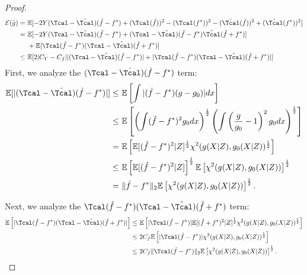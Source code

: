 \documentclass[12pt]{extarticle} %
\newcommand{\E}{\mathbb{E}}
\begin{document}
\begin{proof}
    \begin{align*}
    {\cal E}(\hat{g})
    =~& \E [-2Y (\Tcal-\hat{\Tcal})(\hat{f}-f^*) + (\Tcal(\hat{f}))^2-(\Tcal(f^*))^2 -(\hat{\Tcal}(\hat{f}))^2+(\hat{\Tcal}(f^*))^2]\\
    =~&\E[ -2Y (\Tcal-\hat{\Tcal})(\hat{f}-f^*) + (\Tcal-\hat{\Tcal})(\hat{f}-f^*)\hat{\Tcal}(\hat{f}+f^*)]\\
    ~&+ \E[\Tcal(\hat{f}-f^*)(\Tcal - \hat{\Tcal})(\hat{f}+f^*)]\\
    \leq~& \E[2|C_Y-C_f||(\Tcal-\hat{\Tcal})(\hat{f}-f^*)| + | \Tcal(\hat{f}-f^*)(\Tcal-\hat{\Tcal})(\hat{f}+f^*)|]
\end{align*}
First, we analyze the $(\Tcal-\hat{\Tcal})(\hat{f}-f^*)$ term:
\begin{align*}
    \mathbb{E}[|(\Tcal-\hat{\Tcal})(\hat{f}-f^*)|]\leq~&\mathbb{E}\left[\int |(\hat{f}-f^*)(g-g_0)|dx\right]\\
    \leq~&\mathbb{E}\left[\left(\int (\hat{f}-f^*)^2g_0dx\right)^{\frac{1}{2}}\left(\int\left(\frac{g}{g_0}-1\right)^2g_0dx\right)^{\frac{1}{2}}\right]\\
    =~& \mathbb{E}\left[\mathbb{E}[(\hat{f}-f^*)^2|Z]^{\frac{1}{2}}\mathcal{\chi}^2(g(X|Z),g_0(X|Z))^{\frac{1}{2}}\right]\\
    \leq~& \mathbb{E}\left[\mathbb{E}[(\hat{f}-f^*)^2|Z] \right]^{\frac{1}{2}}\mathbb{E} \left[\mathcal{\chi}^2(g(X|Z),g_0(X|Z))\right]^{\frac{1}{2}}\\
    =~& \|\hat{f}-f^*\|_{2} \mathbb{E} \left[\mathcal{\chi}^2(g(X|Z),g_0(X|Z))\right]^{\frac{1}{2}}.
\end{align*}

Next, we analyze the $\Tcal(\hat{f}-f^*)(\Tcal-\hat{\Tcal})(\hat{f}+f^*)$ term:
\begin{align*}
    \mathbb{E}\left[| \Tcal(\hat{f}-f^*)(\Tcal-\hat{\Tcal})(\hat{f}+f^*)|\right] \leq~& 
    \mathbb{E}\left[|\Tcal(\hat{f}-f^*)|\mathbb{E}[(\hat{f}+f^*)^2|Z]^{\frac{1}{2}}\mathcal{\chi}^2(g(X|Z),g_0(X|Z))^{\frac{1}{2}}\right]\\
    \leq~& 2C_f\mathbb{E}\left[|\Tcal(\hat{f}-f^*)|\mathcal{\chi}^2(g(X|Z),g_0(X|Z))^{\frac{1}{2}}\right]\\
    \leq~&2C_f\|\Tcal(\hat{f}-f^*)\|_2\mathbb{E}\left[\mathcal{\chi}^2(g(X|Z),g_0(X|Z))\right]^{\frac{1}{2}}.
\end{align*}


\end{proof}
\end{document}
